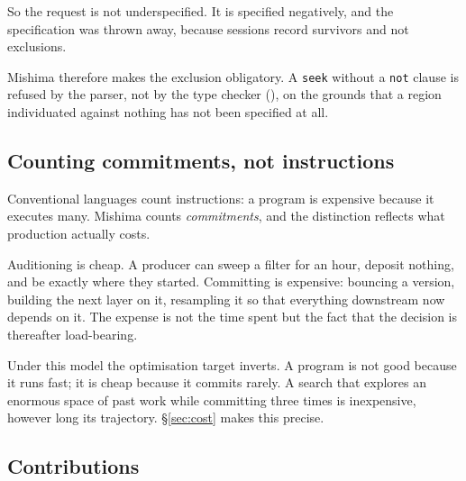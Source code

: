 \documentclass[11pt,twocolumn,a4paper]{article}
\theoremstyle{definition}
\theoremstyle{remark}
\begin{document}
So the request is not underspecified. It is specified negatively, and the
specification was thrown away, because sessions record survivors and not
exclusions.

Mishima therefore makes the exclusion obligatory. A \texttt{seek} without a
\texttt{not} clause is refused by the parser, not by the type checker
(), on the grounds that a region individuated against
nothing has not been specified at all.

\subsection{Counting commitments, not instructions}

Conventional languages count instructions: a program is expensive because it
executes many. Mishima counts \emph{commitments}, and the distinction reflects
what production actually costs.

Auditioning is cheap. A producer can sweep a filter for an hour, deposit nothing,
and be exactly where they started. Committing is expensive: bouncing a version,
building the next layer on it, resampling it so that everything downstream now
depends on it. The expense is not the time spent but the fact that the decision
is thereafter load-bearing.

Under this model the optimisation target inverts. A program is not good because
it runs fast; it is cheap because it commits rarely. A search that explores an
enormous space of past work while committing three times is inexpensive, however
long its trajectory. \S\ref{sec:cost} makes this precise.

\subsection{Contributions}
\end{document}
